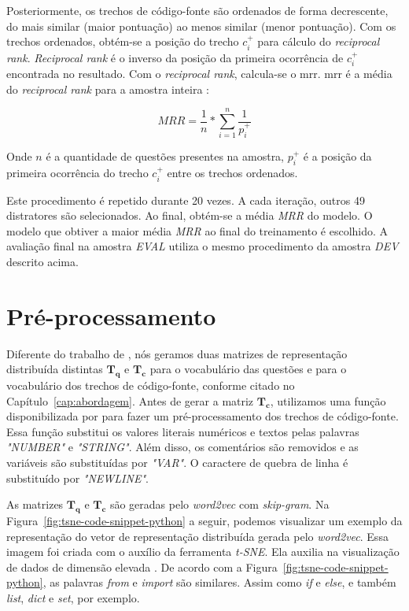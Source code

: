 Posteriormente, os trechos de código-fonte são ordenados de forma decrescente, do mais similar (maior pontuação) ao menos similar (menor pontuação). Com os trechos ordenados, obtém-se a posição do trecho $c_{i}^{+}$ para cálculo do \textit{reciprocal rank}. \textit{Reciprocal rank} é o inverso da posição da primeira ocorrência de $c_{i}^{+}$ encontrada no resultado. Com o \textit{reciprocal rank}, calcula-se o \acrshort{mrr}. \acrshort{mrr} é a média do \textit{reciprocal rank} para a amostra inteira \citep{Gu-deep-code-search:2018}:

\begin{equation}
MRR = \frac{1}{n} * \sum_{i = 1}^{n}\frac{1}{p_{i}^{+}}    
\end{equation}

Onde $n$ é a quantidade de questões presentes na amostra, $p_{i}^{+}$ é a posição da primeira ocorrência do trecho $c_{i}^{+}$ entre os trechos ordenados.

Este procedimento é repetido durante 20 vezes. A cada iteração, outros 49 distratores são selecionados. Ao final, obtém-se a média \emph{MRR} do modelo. O modelo que obtiver a maior média \emph{MRR} ao final do treinamento é escolhido. A avaliação final na amostra \emph{EVAL} utiliza o mesmo procedimento da amostra \emph{DEV} descrito acima.

\section{Pré-processamento}

Diferente do trabalho de \cite{tan-lstm-qa}, nós geramos duas matrizes de representação distribuída distintas $\bm{T_{q}}$ e $\bm{T_{c}}$ para o vocabulário das questões e para o vocabulário dos trechos de código-fonte, conforme citado no Capítulo~\ref{cap:abordagem}. Antes de gerar a matriz $\bm{T_{c}}$, utilizamos uma função disponibilizada por \cite{yao-2018} para fazer um pré-processamento dos trechos de código-fonte. Essa função substitui os valores literais numéricos e textos pelas palavras \emph{"NUMBER"} e \emph{"STRING"}. Além disso, os comentários são removidos e as variáveis são substituídas por \emph{"VAR"}. O caractere de quebra de linha é substituído por \emph{"NEWLINE"}.

As matrizes $\bm{T_{q}}$ e $\bm{T_{c}}$ são geradas pelo \textit{word2vec} com \textit{skip-gram}. Na Figura~\ref{fig:tsne-code-snippet-python} a seguir, podemos visualizar um exemplo da representação do vetor de representação distribuída gerada pelo \textit{word2vec}. Essa imagem foi criada com o auxílio da ferramenta \textit{t-SNE}. Ela auxilia na visualização de dados de dimensão elevada \citep{scikit-learn-tsne-2019, quora-tsne-2019}. De acordo com a Figura~\ref{fig:tsne-code-snippet-python}, as palavras \emph{from} e \emph{import} são similares. Assim como \emph{if} e \emph{else}, e também \emph{list}, \emph{dict} e \emph{set}, por exemplo.

